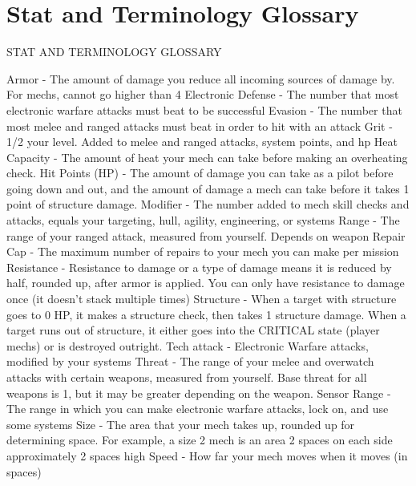 \section{Stat and Terminology Glossary}
                          STAT AND TERMINOLOGY GLOSSARY

Armor - The amount of damage you reduce all incoming sources of damage by. For mechs,
cannot go higher than 4
Electronic Defense - The number that most electronic warfare attacks must beat to be
successful
Evasion - The number that most melee and ranged attacks must beat in order to hit with an
attack
Grit - 1/2 your level. Added to melee and ranged attacks, system points, and hp
Heat Capacity - The amount of heat your mech can take before making an overheating check.
Hit Points (HP) - The amount of damage you can take as a pilot before going down and out, and
the amount of damage a mech can take before it takes 1 point of structure damage.
Modifier - The number added to mech skill checks and attacks, equals your targeting, hull, agility,
engineering, or systems
Range - The range of your ranged attack, measured from yourself. Depends on weapon
Repair Cap - The maximum number of repairs to your mech you can make per mission
Resistance - Resistance to damage or a type of damage means it is reduced by half, rounded up,
after armor is applied. You can only have resistance to damage once (it doesn’t stack multiple
times)
Structure - When a target with structure goes to 0 HP, it makes a structure check, then takes 1
structure damage. When a target runs out of structure, it either goes into the CRITICAL state
(player mechs) or is destroyed outright.
Tech attack - Electronic Warfare attacks, modified by your systems
Threat - The range of your melee and overwatch attacks with certain weapons, measured from
yourself. Base threat for all weapons is 1, but it may be greater depending on the weapon.
Sensor Range - The range in which you can make electronic warfare attacks, lock on, and use
some systems
Size - The area that your mech takes up, rounded up for determining space. For example, a size
2 mech is an area 2 spaces on each side approximately 2 spaces high
Speed - How far your mech moves when it moves (in spaces)


